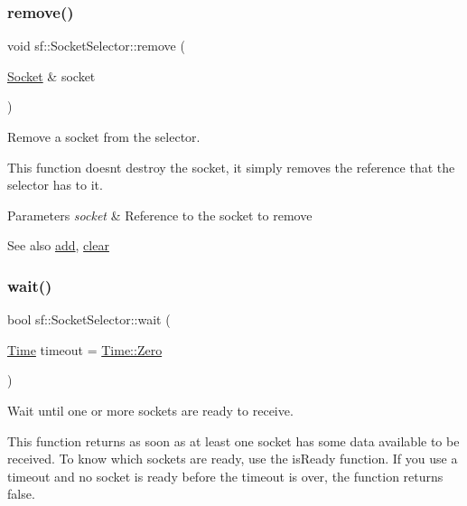 \subsubsection{\texorpdfstring{remove()}{remove()}}
{\footnotesize\ttfamily void sf\+::\+Socket\+Selector\+::remove (\begin{DoxyParamCaption}\item[{\mbox{\hyperlink{classsf_1_1_socket}{Socket}} \&}]{socket }\end{DoxyParamCaption})}



Remove a socket from the selector. 

This function doesn\textquotesingle{}t destroy the socket, it simply removes the reference that the selector has to it.


\begin{DoxyParams}{Parameters}
{\em socket} & Reference to the socket to remove\\
\hline
\end{DoxyParams}
\begin{DoxySeeAlso}{See also}
\mbox{\hyperlink{classsf_1_1_socket_selector_ade952013232802ff7b9b33668f8d2096}{add}}, \mbox{\hyperlink{classsf_1_1_socket_selector_a76e650acb0199d4be91e90a493fbc91a}{clear}} \begin{DoxyVerb}\end{DoxyVerb}
 
\end{DoxySeeAlso}
\mbox{\label{classsf_1_1_socket_selector_a9cfda5475f17925e65889394d70af702}} 
\subsubsection{\texorpdfstring{wait()}{wait()}}
{\footnotesize\ttfamily bool sf\+::\+Socket\+Selector\+::wait (\begin{DoxyParamCaption}\item[{\mbox{\hyperlink{classsf_1_1_time}{Time}}}]{timeout = {\ttfamily \mbox{\hyperlink{classsf_1_1_time_a8db127b632fa8da21550e7282af11fa0}{Time\+::\+Zero}}} }\end{DoxyParamCaption})}



Wait until one or more sockets are ready to receive. 

This function returns as soon as at least one socket has some data available to be received. To know which sockets are ready, use the is\+Ready function. If you use a timeout and no socket is ready before the timeout is over, the function returns false.


